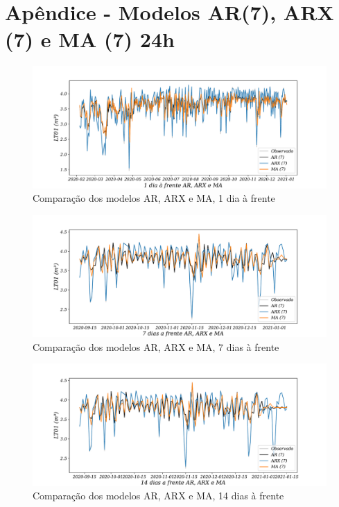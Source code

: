 
\section{Ap\^endice - Modelos AR(7), ARX (7) e MA (7) 24h }\label{sec:ararxma24}

\begin{figure}[H]
	\centering
	\caption{Comparação dos modelos AR, ARX e MA, 1 dia à frente }
	\label{fig:1-AR-ARX-MA24}
	\includegraphics[width=1\linewidth]{Apendices/Figuras/modelagem-24h/1-AR-ARX-MA}
	
\end{figure}

\begin{figure}[H]
	\centering
	\caption{Comparação dos modelos AR, ARX e MA, 7 dias à frente }
	\label{fig:10-AR-ARX-MA24}
	\includegraphics[width=1\linewidth]{Apendices/Figuras/modelagem-24h/7-AR-ARX-MA}
	
\end{figure}


\begin{figure}[H]
	\centering
	\caption{Comparação dos modelos AR, ARX e MA, 14 dias à frente }
	\label{fig:30-AR-ARX-MA24}
	\includegraphics[width=1\linewidth]{Apendices/Figuras/modelagem-24h/14-AR-ARX-MA}
	
\end{figure}

